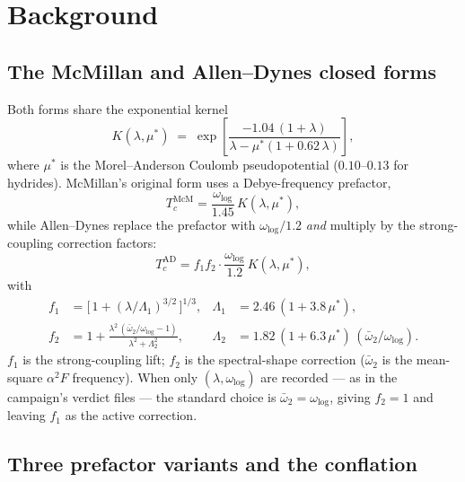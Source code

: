 \documentclass[11pt,a4paper]{article}
\begin{document}
\section{Background}
\label{sec:bg}

\subsection{The McMillan and Allen--Dynes closed forms}

Both forms share the exponential kernel
\begin{equation}
  K(\lambda,\mu^*) \;=\;
  \exp\!\left[\frac{-1.04\,(1+\lambda)}
                  {\lambda - \mu^*(1+0.62\,\lambda)}\right],
  \label{eq:kernel}
\end{equation}
where $\mu^*$ is the Morel--Anderson Coulomb pseudopotential
($0.10$--$0.13$ for hydrides). McMillan's original form uses a Debye-frequency
prefactor,
\begin{equation}
  T_c^{\mathrm{McM}} = \frac{\omega_{\log}}{1.45}\,K(\lambda,\mu^*),
  \label{eq:mcmillan}
\end{equation}
while Allen--Dynes replace the prefactor with $\omega_{\log}/1.2$ \emph{and}
multiply by the strong-coupling correction factors:
\begin{equation}
  T_c^{\mathrm{AD}} = f_1 f_2 \cdot \frac{\omega_{\log}}{1.2}\,K(\lambda,\mu^*),
  \label{eq:ad}
\end{equation}
with
\begin{align}
  f_1 &= \Big[\,1 + (\lambda/\Lambda_1)^{3/2}\,\Big]^{1/3}, &
        \Lambda_1 &= 2.46\,(1+3.8\,\mu^*), \\
  f_2 &= 1 + \frac{\lambda^2\,(\bar\omega_2/\omega_{\log}-1)}
                   {\lambda^2 + \Lambda_2^2}, &
        \Lambda_2 &= 1.82\,(1+6.3\,\mu^*)\,(\bar\omega_2/\omega_{\log}).
\end{align}
$f_1$ is the strong-coupling lift; $f_2$ is the spectral-shape correction
($\bar\omega_2$ is the mean-square $\alpha^2F$ frequency). When only
$(\lambda,\omega_{\log})$ are recorded --- as in the campaign's verdict files ---
the standard choice is $\bar\omega_2=\omega_{\log}$, giving $f_2=1$ and leaving
$f_1$ as the active correction.

\subsection{Three prefactor variants and the conflation}
\end{document}
